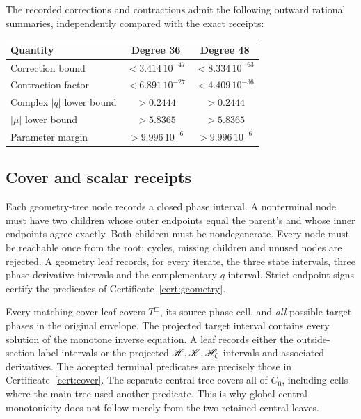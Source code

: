 The recorded corrections and contractions admit the following outward
rational summaries, independently compared with the exact receipts:
\begin{center}
\begin{tabular}{lcc}
Quantity & Degree 36 & Degree 48\\ \hline
Correction bound & \(<3.414\,10^{-47}\)&\(<8.334\,10^{-63}\)\\
Contraction factor & \(<6.891\,10^{-27}\)&\(<4.409\,10^{-36}\)\\
Complex \(|q|\) lower bound & \(>0.2444\)&\(>0.2444\)\\
\(|\mu|\) lower bound & \(>5.8365\)&\(>5.8365\)\\
Parameter margin & \(>9.996\,10^{-6}\)&\(>9.996\,10^{-6}\)
\end{tabular}
\end{center}

\subsection{Cover and scalar receipts}
Each geometry-tree node records a closed phase interval. A nonterminal
node must have two children whose outer endpoints equal the parent's
and whose inner endpoints agree exactly. Both children must be
nondegenerate. Every node must be reachable once from the root;
cycles, missing children and unused nodes are rejected. A geometry
leaf records, for every iterate, the three state intervals, three
phase-derivative intervals and the complementary-\(q\) interval.
Strict endpoint signs certify the predicates of
Certificate~\ref{cert:geometry}.

Every matching-cover leaf covers \(T^\Box\), its source-phase cell,
and \emph{all} possible target phases in the original envelope.
The projected target interval contains every solution of the
monotone inverse equation. A leaf records either the outside-section
label intervals or the projected \(\mathscr H,\mathscr K,\mathscr H_\zeta\) intervals and
associated derivatives. The accepted terminal predicates are precisely
those in Certificate~\ref{cert:cover}. The separate central tree covers
all of \(C_0\), including cells where the main tree used another
predicate. This is why global central monotonicity does not follow
merely from the two retained central leaves.

